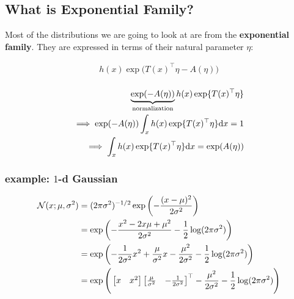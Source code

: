 \documentclass{article}
\begin{document}
\subsection{What is Exponential Family?}



Most of the distributions we are going to look at are from the {\bf exponential family}. They are expressed in terms of their natural parameter $\eta$:

\begin{equation}\begin{split}\label{eq exponential family distribution formula}
h(x) \exp \big(   T(x)^\top \eta  - A(\eta)   \big)\\
\end{split}\end{equation}

\begin{equation}\begin{split}
\underbrace{\exp( - A(\eta))}_{\text{normalization}} h (x) \exp \{ T (x)^\top \eta \}\\
\implies   \exp( - A(\eta)) \int_{x} h (x) \exp \{ T (x)^\top \eta \} \text{d} x = 1\\
\implies \int_{x}  h (x) \exp \{ T (x)^\top \eta  \} \text{d} x = \exp(A (\eta) )
\end{split}\end{equation}




\subsubsection{example: $1$-d Gaussian}\label{sec Gaussian: Natural Parameter Representation}


\begin{equation}\begin{split}\label{eq Gaussian: Natural Parameter Representation}
\mathcal{N}(x; \mu, \sigma^2) &= (2 \pi \sigma^2)^{-1/2} \exp \left( -\frac{(x-\mu)^2}{2 \sigma^2} \right)\\
&= \exp \left(  - \frac{x^2 - 2x \mu + \mu^2}{ 2 \sigma^2} - \frac{1}{2} \log ( 2 \pi \sigma^2) \right)\\
&= \exp \left(  - \frac{1}{ 2 \sigma^2} x^2 + \frac{ \mu}{\sigma^2} x  - \frac{\mu^2}{ 2 \sigma^2} - \frac{1}{2} \log ( 2 \pi \sigma^2) \right)\\
&= \exp \Bigg(   \begin{bmatrix} x & x^2   \end{bmatrix} \begin{bmatrix} \frac{ \mu}{ \sigma^2}  & - \frac{1}{ 2 \sigma^2}   \end{bmatrix}^\top  - \frac{\mu^2}{ 2 \sigma^2} - \frac{1}{2} \log ( 2 \pi \sigma^2) \Bigg)\\
\end{split}\end{equation}
\end{document}
